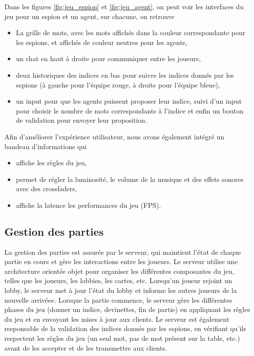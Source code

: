 \documentclass[12pt,a4paper]{article}
\begin{document}

        Dans les figures \ref{fig:jeu_espion} et \ref{fig:jeu_agent}, on peut voir les interfaces du jeu pour un espion et un agent, sur chacune, on retrouve
        \begin{itemize}
            \item La grille de mots, avec les mots affichés dans la couleur correspondante pour les espions, et affichés de couleur neutres pour les agents,
            \item un chat en haut à droite pour communiquer entre les joueurs,
            \item deux historiques des indices en bas pour suivre les indices donnés par les espions (à gauche pour l'équipe rouge, à droite pour l'équipe bleue),
            \item un input pour que les agents puissent proposer leur indice, suivi d'un input pour choisir le nombre de mots correspondants à l'indice et enfin un bouton de validation pour envoyer leur proposition.
        \end{itemize}

        \vspace{0.5cm}

        Afin d'améliorer l'expérience utilisateur, nous avons également intégré un bandeau d'informations qui 
        \begin{itemize}
            \item affiche les règles du jeu,
            \item permet de régler la luminosité, le volume de la musique et des effets sonores avec des crossfaders,
            \item affiche la latence les performances du jeu (FPS).
        \end{itemize}

        \subsection{Gestion des parties}

        La gestion des parties est assurée par le serveur, qui maintient l'état de chaque partie en cours et gère les interactions entre les joueurs.
        Le serveur utilise une architecture orientée objet pour organiser les différentes composantes du jeu, telles que les joueurs, les lobbies, les cartes, etc.
        Lorsqu'un joueur rejoint un lobby, le serveur met à jour l'état du lobby et informe les autres joueurs de la nouvelle arrivéee.
        Lorsque la partie commence, le serveur gère les différentes phases du jeu (donner un indice, devinettes, fin de partie) en appliquant les règles du jeu et en envoyant les mises à jour aux clients.
        Le serveur est également responsable de la validation des indices donnés par les espions, en vérifiant qu'ils respectent les règles du jeu (un seul mot, pas de mot présent sur la table, etc.) avant de les accepter et de les transmettre aux clients.
\end{document}
